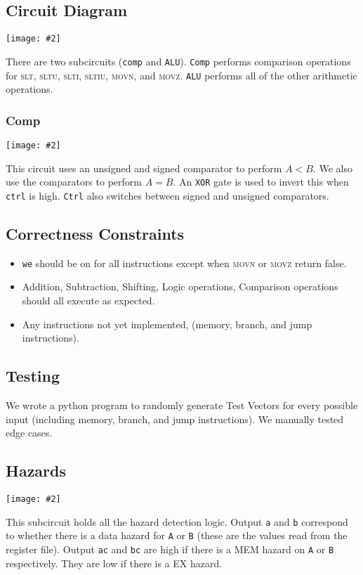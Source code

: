 \documentclass[10pt]{article}
\newcommand{\diagram}[2][1]{\begin{center}\texttt{[image: \#2]}\end{center}}
\begin{document}
\subsection{Circuit Diagram}
\diagram{execute}
There are two subcircuits (\texttt{comp} and \texttt{ALU}).
\texttt{Comp} performs comparison operations for \textsc{slt}, \textsc{sltu}, \textsc{slti}, \textsc{sltiu}, \textsc{movn}, and \textsc{movz}.
\texttt{ALU} performs all of the other arithmetic operations.

\subsubsection{Comp}
\diagram[0.7]{comp}
This circuit uses an unsigned and signed comparator to perform $A < B$.
We also use the comparators to perform $A = B$. An \texttt{XOR} gate is used to invert this when \texttt{ctrl} is high.
\texttt{Ctrl} also switches between signed and unsigned comparators.

\subsection{Correctness Constraints}
\begin{itemize}
\item \texttt{we} should be on for all instructions except when \textsc{movn} or \textsc{movz} return false.
\item Addition, Subtraction, Shifting, Logic operations, Comparison operations should all execute as expected. 
\item Any instructions not yet implemented, (memory, branch, and jump instructions).
\end{itemize}

\subsection{Testing}
We wrote a python program to randomly generate Test Vectors for every possible input (including memory, branch, and jump instructions).
We manually tested edge cases.

\subsection{Hazards}
\diagram[0.8]{hazard}
This subcircuit holds all the hazard detection logic.
Output \texttt{a} and \texttt{b} correspond to whether there is a data hazard for \texttt{A} or \texttt{B} (these are the values read from the register file).
Output \texttt{ac} and \texttt{bc} are high if there is a MEM hazard on \texttt{A} or \texttt{B} respectively. They are low if there is a EX hazard. 
\end{document}
